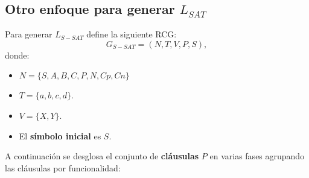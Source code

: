 \subsection{Otro enfoque para generar $L_{SAT}$}

Para generar $L_{S-SAT}$ define la siguiente RCG:
\[
    G_{S-SAT} = (N, T, V, P, S),
\]
donde:

\begin{itemize}
    \item $N=\{S,A,B,C,P,N,Cp,Cn\}$
    \item $T=\{a,b,c,d\}$.
    \item $V=\{X,Y\}$.
    \item El \textbf{símbolo inicial} es $S$.
\end{itemize}

A continuación se desglosa el conjunto de \textbf{cláusulas} $P$ en varias fases agrupando las cláusulas
por funcionalidad:

